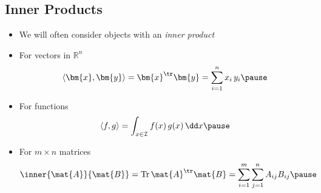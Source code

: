 
\begin{slide}
\section[-1]{Inner Products}

\begin{PauseHighLight}
  \begin{itemize}
  \item We will often consider objects with an \textit{inner product}\pause
  \item For vectors in $\mathbb{R}^n$
    \begin{align*}
      \langle \bm{x}, \bm{y} \rangle = \bm{x}^\tr\bm{y} = \sum_{i=1}^n
      x_i\,y_i \pause
    \end{align*}
  \item For functions\vspace*{-1em}
    \begin{align*}
      \langle f, g \rangle = \int_{x\in\mathcal{I}} f(x)\,g(x)\,\dd x\pause
    \end{align*}
  \item For $m \times n$ matrices\vspace*{-1em}
    \begin{align*}
      \inner{\mat{A}}{\mat{B}} = \mathrm{Tr} \, \mat{A}^\tr \mat{B} =
      \sum_{i=1}^m \sum_{j=1}^n A_{ij} B_{ij}\pause
    \end{align*}
  \end{itemize}
\end{PauseHighLight}

\end{slide}


